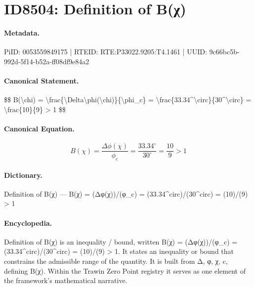 \section*{ID8504: Definition of B(χ)}
\paragraph{Metadata.}
PiID: 0053559849175 | RTEID: RTE:P33022.9205:T4.1461 | UUID: 9c66bc5b-992d-5f14-b52a-ff08df9e84a2

\paragraph{Canonical Statement.}
\$\$ B(\textbackslash{}chi) = \textbackslash{}frac\{\textbackslash{}Delta\textbackslash{}phi(\textbackslash{}chi)\}\{\textbackslash{}phi\_c\} = \textbackslash{}frac\{33.34\textasciicircum{}\textbackslash{}circ\}\{30\textasciicircum{}\textbackslash{}circ\} = \textbackslash{}frac\{10\}\{9\} > 1 \$\$

\paragraph{Canonical Equation.}
\[
B(\chi) = \frac{\Delta\phi(\chi)}{\phi_c} = \frac{33.34^\circ}{30^\circ} = \frac{10}{9} > 1
\]

\paragraph{Dictionary.}
Definition of B(χ) — B(χ) = (Δφ(χ))/(φ\_c) = (33.34\textasciicircum{}circ)/(30\textasciicircum{}circ) = (10)/(9) > 1

\paragraph{Encyclopedia.}
Definition of B(χ) is an inequality / bound, written B(χ) = (Δφ(χ))/(φ\_c) = (33.34\textasciicircum{}circ)/(30\textasciicircum{}circ) = (10)/(9) > 1. It states an inequality or bound that constrains the admissible range of the quantity. It is built from Δ, φ, χ, c, defining B(χ). Within the Trawin Zero Point registry it serves as one element of the framework's mathematical narrative.
